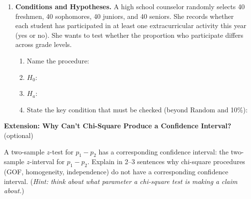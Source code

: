 \documentclass[10pt]{article}
\begin{document}
\begin{enumerate}
\begin{enumerate}[label=\alph*.]
        \boxguard[16]
        \item Write $H_0$ for the correct procedure.
              $H_0$: 
      \end{enumerate}

\vspace{0.10in}

\boxguard[22]
\item \textbf{Conditions and Hypotheses.} \;
      A high school counselor randomly selects 40 freshmen, 40 sophomores, 40 juniors, and
      40 seniors. She records whether each student has participated in at least one extracurricular
      activity this year (yes or no). She wants to test whether the proportion who participate
      differs across grade levels.

      \begin{enumerate}[label=\alph*.]
        \item Name the procedure: \gradedblank[id=hw5a, type=short, points=1, answer={chi-square test for homogeneity}, check=text, display={\bfseries $\chi^2$ test for homogeneity}]{3in}{0.3in}
        \boxguard[14]
        \item $H_0$: 
        \boxguard[14]
        \item $H_a$: 
        \boxguard[16]
        \item State the key condition that must be checked (beyond Random and 10\%): 
      \end{enumerate}

\end{enumerate}

\begin{extensionbox}
\textbf{Extension: Why Can't Chi-Square Produce a Confidence Interval?} (optional)

A two-sample $z$-test for $p_1 - p_2$ has a corresponding confidence interval: the two-sample
$z$-interval for $p_1 - p_2$. Explain in 2--3 sentences why chi-square procedures (GOF,
homogeneity, independence) do not have a corresponding confidence interval. (\textit{Hint:
think about what parameter a chi-square test is making a claim about.})
\end{extensionbox}
\end{document}
